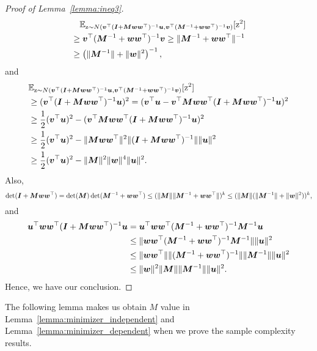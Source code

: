 \begin{proof}[Proof of Lemma~\ref{lemma:ineq3}]
\begin{align*}
&\quad \mathbb{E}_{{\textnormal{z}} \sim N\left( {\bm{v}}^\top({\bm{I}}+{\bm{M}}{\bm{w}}{\bm{w}}^\top)^{-1}{\bm{u}}, {\bm{v}}^\top({\bm{M}}^{-1}+ {\bm{w}} {\bm{w}}^\top)^{-1}{\bm{v}} \right)}[{\textnormal{z}}^2]\\
&\geq {\bm{v}}^\top({\bm{M}}^{-1}+ {\bm{w}}{\bm{w}}^\top)^{-1}{\bm{v}} \geq \lVert {\bm{M}}^{-1} + {\bm{w}} {\bm{w}}^\top\rVert^{-1}\\
&\geq \left( \lVert {\bm{M}}^{-1} \rVert + \lVert {\bm{w}}\rVert^2 \right)^{-1},
\end{align*}
and
\begin{align*}
&\mathbb{E}_{{\textnormal{z}} \sim N\left( {\bm{v}}^\top({\bm{I}}+{\bm{M}}{\bm{w}}{\bm{w}}^\top)^{-1}{\bm{u}}, {\bm{v}}^\top({\bm{M}}^{-1}+ {\bm{w}} {\bm{w}}^\top)^{-1} {\bm{v}} \right)}[{\textnormal{z}}^2]\\
&\geq ( {\bm{v}}^\top({\bm{I}}+{\bm{M}}{\bm{w}}{\bm{w}}^\top)^{-1}{\bm{u}})^2 = ({\bm{v}}^\top {\bm{u}} - {\bm{v}}^\top {\bm{M}}{\bm{w}}{\bm{w}}^\top ({\bm{I}} + {\bm{M}} {\bm{w}} {\bm{w}}^\top)^{-1}{\bm{u}})^2\\ 
&\geq \frac{1}{2} ({\bm{v}}^\top {\bm{u}})^2 - ({\bm{v}}^\top {\bm{M}} {\bm{w}}{\bm{w}}^\top ({\bm{I}} + {\bm{M}} {\bm{w}} {\bm{w}}^\top)^{-1} {\bm{u}})^2 \\
&\geq \frac{1}{2}  ({\bm{v}}^\top {\bm{u}})^2 - \lVert {\bm{M}} {\bm{w}} {\bm{w}}^\top \rVert^2 \lVert({\bm{I}} + {\bm{M}} {\bm{w}} {\bm{w}}^\top)^{-1} \rVert \lVert {\bm{u}} \rVert^2\\
&\geq \frac{1}{2} ({\bm{v}}^\top {\bm{u}})^2 - \lVert {\bm{M}}\rVert^2 \lVert {\bm{w}}\rVert^4 \lVert {\bm{u}} \rVert^2.
\end{align*}
Also,
\begin{equation*}
\det({\bm{I}}+{\bm{M}} {\bm{w}} {\bm{w}}^\top) = \det({\bm{M}}) \det({\bm{M}}^{-1} + {\bm{w}} {\bm{w}}^\top) \leq (\lVert {\bm{M}}\rVert\lVert {\bm{M}}^{-1} + {\bm{w}}{\bm{w}}^\top\rVert)^k \leq (\lVert {\bm{M}}\rVert (\lVert {\bm{M}}^{-1}\rVert + \lVert {\bm{w}}\rVert^2))^k,
\end{equation*}
and
\begin{align*}
    {\bm{u}}^\top {\bm{w}}{\bm{w}}^\top ({\bm{I}}+{\bm{M}}{\bm{w}}{\bm{w}}^\top )^{-1} {\bm{u}}  &= {\bm{u}}^\top {\bm{w}}{\bm{w}}^\top  ({\bm{M}}^{-1}+{\bm{w}}{\bm{w}}^\top)^{-1} {\bm{M}}^{-1} {\bm{u}}\\
    &\leq \lVert {\bm{w}}{\bm{w}}^\top  ({\bm{M}}^{-1}+{\bm{w}}{\bm{w}}^\top)^{-1}{\bm{M}}^{-1} \rVert \lVert {\bm{u}} \rVert^2\\
    &\leq \lVert {\bm{w}}{\bm{w}}^\top \rVert \lVert ({\bm{M}}^{-1}+{\bm{w}}{\bm{w}}^\top)^{-1} \rVert \lVert {\bm{M}}^{-1} \rVert  \lVert {\bm{u}} \rVert^2\\
    &\leq \lVert {\bm{w}} \rVert^2  \lVert {\bm{M}} \rVert \lVert {\bm{M}}^{-1} \rVert\lVert {\bm{u}}\rVert^2.
\end{align*}
Hence, we have our conclusion.
\end{proof}

The following lemma makes us obtain $M$ value in Lemma~\ref{lemma:minimizer_independent} and Lemma~\ref{lemma:minimizer_dependent} when we prove the sample complexity results.

